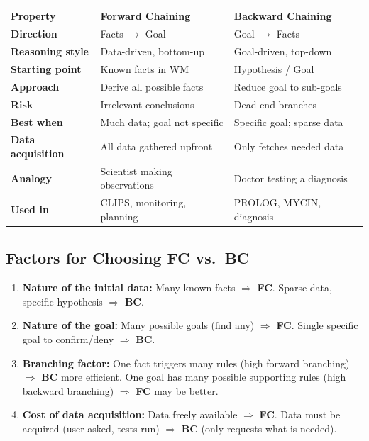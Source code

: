 \documentclass[12pt,a4paper]{article}
\begin{document}
\begin{center}
\renewcommand{\arraystretch}{1.45}
\begin{tabular}{>{\bfseries}p{3.6cm} p{4.9cm} p{4.9cm}}
\toprule
Property & Forward Chaining & Backward Chaining \\
\midrule
Direction          & Facts $\rightarrow$ Goal       & Goal $\rightarrow$ Facts \\
Reasoning style    & Data-driven, bottom-up         & Goal-driven, top-down \\
Starting point     & Known facts in WM              & Hypothesis / Goal \\
Approach           & Derive all possible facts      & Reduce goal to sub-goals \\
Risk               & Irrelevant conclusions         & Dead-end branches \\
Best when          & Much data; goal not specific   & Specific goal; sparse data \\
Data acquisition   & All data gathered upfront      & Only fetches needed data \\
Analogy            & Scientist making observations  & Doctor testing a diagnosis \\
Used in            & CLIPS, monitoring, planning    & PROLOG, MYCIN, diagnosis \\
\bottomrule
\end{tabular}
\end{center}

\subsection{Factors for Choosing FC vs.\ BC}

\begin{enumerate}[itemsep=6pt]
  \item \textbf{Nature of the initial data:}
        Many known facts $\Rightarrow$ \textbf{FC}.
        Sparse data, specific hypothesis $\Rightarrow$ \textbf{BC}.

  \item \textbf{Nature of the goal:}
        Many possible goals (find any) $\Rightarrow$ \textbf{FC}.
        Single specific goal to confirm/deny $\Rightarrow$ \textbf{BC}.

  \item \textbf{Branching factor:}
        One fact triggers many rules (high forward branching) $\Rightarrow$ \textbf{BC} more efficient.
        One goal has many possible supporting rules (high backward branching) $\Rightarrow$ \textbf{FC} may be better.

  \item \textbf{Cost of data acquisition:}
        Data freely available $\Rightarrow$ \textbf{FC}.
        Data must be acquired (user asked, tests run) $\Rightarrow$ \textbf{BC} (only requests what is needed).
\end{enumerate}
\end{document}
